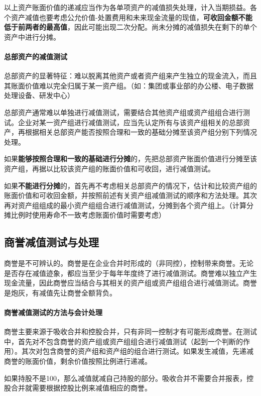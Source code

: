 \documentclass[UTF8,12pt]{ctexart}
\numberwithin{equation}{section} %
\numberwithin{figure}{section}
\numberwithin{table}{section}
\begin{document}
	以上资产账面价值的递减应当作为各单项资产的减值损失处理，计入当期损益。各个资产减值也要考虑公允价值-处置费用和未来现金流量的现值，\textbf{可收回金额不能低于前两者的最高值}，因此可能出现二次分配。尚未分摊的减值损失在剩下的单个资产中进行分摊。 
	
	\paragraph{总部资产的减值测试}
	总部资产的显著特征：难以脱离其他资产或者资产组来产生独立的现金流入，而且其账面价值难以完全归属于某一资产组。（如：集团或事业部的办公楼、电子数据处理设备、研发中心）
	
	总部资产通常难以单独进行减值测试，需要结合其他资产组或资产组组合进行测试。企业对某一资产组进行减值测试，应当先认定所有与该资产组相关的总部资产，再根据相关总部资产能否按照合理和一致的基础分摊至该资产组分别下列情况处理。
	
	如果\textbf{能够按照合理和一致的基础进行分摊}的，先把总部资产账面价值进行分摊至该资产组，再据以比较该资产组的账面价值和可收回，进行减值测试。
	
	如果\textbf{不能进行分摊}的，首先再不考虑相关总部资产的情况下，估计和比较资产组的账面价值和可收回金额，并按照前述有关资产组减值测试的顺序和方法处理。其次再对资产组组成的最小资产组组合进行减值测试，分摊到各个资产组上。（计算分摊比例时使用寿命不一致考虑账面价值时需要考虑）
	
	\subsection{商誉减值测试与处理}
	商誉是不可辨认的。商誉是在企业合并时形成的（非同控），控制带来商誉。无论是否存在减值迹象，都应当至少于每年年度终了进行减值测试。商誉难以独立产生现金流量，因此商誉应当结合与其相关的资产组或资产组组合进行减值测试。商誉是炮灰，有减值先让商誉全额背负。
	
	\paragraph{商誉减值测试的方法与会计处理}
	商誉主要来源于吸收合并和控股合并，只有非同一控制才有可能形成商誉。在测试中，首先对不包含商誉的资产组或资产组组合进行减值测试（起到一个判断的作用）。其次对包含商誉的资产组和资产组的组合进行测试。如果发生减值，先递减商誉的账面价值，剩余价值按照比例进行递减。
	
	如果持股不是100，那么减值就减自己持股的部分。吸收合并不需要合并报表，控股合并就需要根据控股比例来减值相应的商誉。
	
\end{document}
